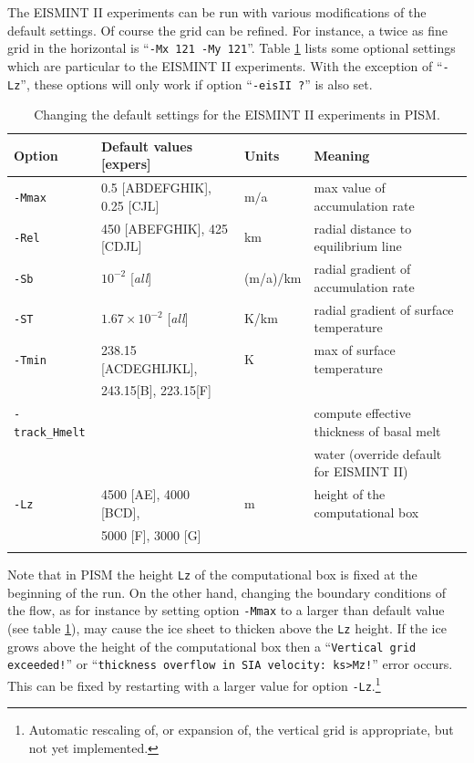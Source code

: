 \documentclass[11pt,final]{amsart}
\renewcommand{\t}[1]{\texttt{#1}}
\begin{document}
The EISMINT II experiments can be run with various modifications of the default settings.  Of course the grid can be refined.  For instance, a twice as fine grid in the horizontal is ``\t{-Mx 121 -My 121}''.  Table \ref{tab:eisIIoptions} lists some optional settings which are particular to the EISMINT II experiments.  With the exception of ``\verb|-Lz|'', these options will only work if option ``\t{-eisII ?}'' is also set.

\begin{table}[ht]
\caption{Changing the default settings for the EISMINT II experiments in PISM.}\label{tab:eisIIoptions}
\small
\begin{tabular}{@{}llll}\hline
\textbf{Option} & \textbf{Default values [expers]} & \textbf{Units} & \textbf{Meaning} \\ \hline
\verb|-Mmax| & 0.5 [ABDEFGHIK], 0.25 [CJL] & m$/$a & max value of accumulation rate \\
\verb|-Rel| & 450 [ABEFGHIK], 425 [CDJL] & km & radial distance to equilibrium line \\
\verb|-Sb| & $10^{-2}$ [\emph{all}] & (m/a)/km & radial gradient of accumulation rate \\
\verb|-ST| & $1.67 \times 10^{-2}$ [\emph{all}] & K/km & radial gradient of surface temperature\\
\verb|-Tmin| & 238.15 [ACDEGHIJKL], & K & max of surface temperature \\
 & 243.15[B], 223.15[F] & & \\
\verb|-track_Hmelt| &  &  & compute effective thickness of basal melt \\
 &  &  & water (override default for EISMINT II) \\
\verb|-Lz| & 4500 [AE], 4000 [BCD], & m & height of the computational box \\
 & 5000 [F], 3000 [G] &  &  \\
\hline\normalsize
\end{tabular}\end{table}

Note that in PISM the height \verb|Lz| of the computational box is fixed at the beginning of the run.  On the other hand, changing the boundary conditions of the flow, as for instance by setting option \verb|-Mmax| to a larger than default value (see table \ref{tab:eisIIoptions}), may cause the ice sheet to thicken above the \verb|Lz| height.  If the ice grows above the height of the computational box then a ``\verb|Vertical grid exceeded!|'' or ``\verb|thickness overflow in SIA velocity: ks>Mz!|'' error occurs.  This can be fixed by restarting with a larger value for option \verb|-Lz|.\footnote{Automatic rescaling of, or expansion of, the vertical grid is appropriate, but not yet implemented.}
\end{document}
